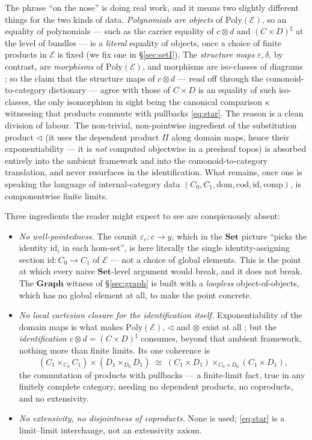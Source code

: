 \documentclass[11pt]{amsart}
\theoremstyle{plain}
\theoremstyle{definition}
\theoremstyle{remark}
\newcommand{\Set}{\mathbf{Set}}
\newcommand{\Graph}{\mathbf{Graph}}
\newcommand{\Poly}{\mathrm{Poly}}
\newcommand{\Ee}{\mathcal{E}}
\newcommand{\sub}{\triangleleft}      %
\newcommand{\sharpc}[1]{#1^{\sharp}}   %
\newcommand{\id}{\mathrm{id}}
\newcommand{\dom}{\mathrm{dom}}
\newcommand{\cod}{\mathrm{cod}}
\newcommand{\comp}{\mathrm{comp}}
\begin{document}
The phrase ``on the nose'' is doing real work, and it means two slightly different things for the two
kinds of data. \emph{Polynomials are objects} of $\Poly(\Ee)$, so an equality of polynomials --- such
as the carrier equality of $c\otimes d$ and $\sharpc{(C\times D)}$ at the level of bundles --- is a
\emph{literal} equality of objects, once a choice of finite products in $\Ee$ is fixed (we fix one in
\S\ref{sec:setI}). The \emph{structure maps} $\varepsilon,\delta$, by contrast, are \emph{morphisms}
of $\Poly(\Ee)$, and morphisms are iso-classes of diagrams \cite[Def.~3.7, 3.13]{ShapiroSpivak2023};
so the claim that the structure maps of $c\otimes d$ --- read off through the comonoid-to-category
dictionary --- agree with those of $C\times D$ is an equality of such iso-classes, the only
isomorphism in sight being the canonical comparison $\kappa$ witnessing that products commute with
pullbacks \eqref{eq:star}. The reason is a clean division of labour. The non-trivial, non-pointwise
ingredient of the substitution product $\sub$ (it uses the dependent product $\Pi$ along domain maps,
hence their exponentiability --- it is \emph{not} computed objectwise in a presheaf topos) is absorbed
entirely into the ambient framework and into the comonoid-to-category translation, and never
resurfaces in the identification. What remains, once one is speaking the language of internal-category
data $(C_0,C_1,\dom,\cod,\id,\comp)$, is componentwise finite limits.

Three ingredients the reader might expect to see are conspicuously absent:

\begin{itemize}
\item \emph{No well-pointedness.} The counit $\varepsilon_c:c\to y$, which in the $\Set$ picture
``picks the identity $\id_i$ in each hom-set'', is here literally the single identity-assigning
section $\id:C_0\to C_1$ of $\Ee$ --- not a choice of global elements. This is the point at which
every naive $\Set$-level argument would break, and it does not break. The $\Graph$ witness of
\S\ref{sec:graph} is built with a \emph{loopless} object-of-objects, which has no global element at
all, to make the point concrete.
\item \emph{No local cartesian closure for the identification itself.} Exponentiability of the
domain maps is what makes $\Poly(\Ee)$, $\sub$ and $\otimes$ exist at all
\cite[Thm.~3.26, Def.~4.1, Lem.~4.3, Thm.~4.5]{ShapiroSpivak2023}; but the \emph{identification}
$c\otimes d=\sharpc{(C\times D)}$ consumes, beyond that ambient framework, nothing more than finite
limits. Its one coherence is
\begin{equation}\label{eq:star}
  (C_1\times_{C_0}C_1)\times(D_1\times_{D_0}D_1)\;\cong\;(C_1\times D_1)\times_{C_0\times D_0}(C_1\times D_1),
  \tag{$\star$}
\end{equation}
the commutation of products with pullbacks --- a finite-limit fact, true in any finitely complete
category, needing no dependent products, no coproducts, and no extensivity.
\item \emph{No extensivity, no disjointness of coproducts.} None is used; \eqref{eq:star} is a
limit--limit interchange, not an extensivity axiom.
\end{itemize}
\end{document}
